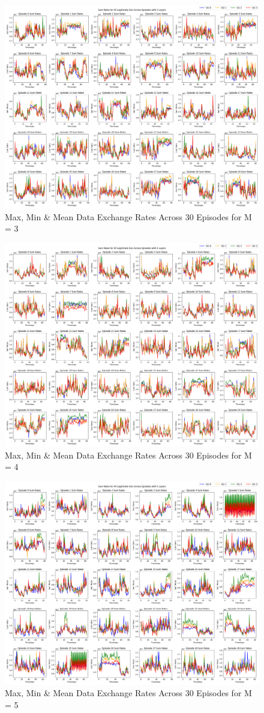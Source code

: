 \begin{figure}
    \centering
    \includegraphics[width=0.8\linewidth]{figures/test8_without_trajectory/3_layers_sum_rates.png}
    \caption{Max, Min \& Mean Data Exchange Rates Across 30 Episodes for M = 3}
    \label{fig:data_rate_3_layers_30_ep}
\end{figure}
\begin{figure}
    \centering
    \includegraphics[width=0.8\linewidth]{figures/test8_without_trajectory/4_layers_sum_rates.png}
    \caption{Max, Min \& Mean Data Exchange Rates Across 30 Episodes for M = 4}
    \label{fig:data_rate_4_layers_30_ep}
\end{figure}
\begin{figure}
    \centering
    \includegraphics[width=0.8\linewidth]{figures/test8_without_trajectory/5_layers_sum_rates.png}
    \caption{Max, Min \& Mean Data Exchange Rates Across 30 Episodes for M = 5}
    \label{fig:data_rate_5_layers_30_ep}
\end{figure}